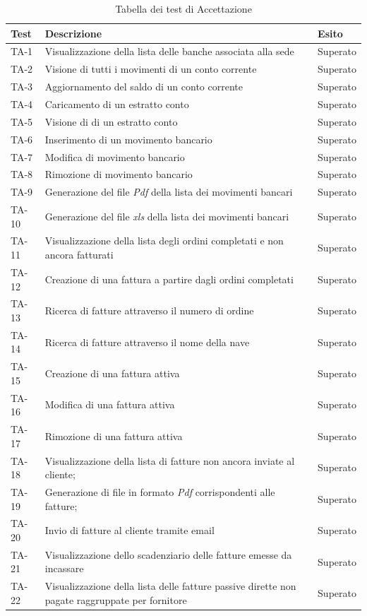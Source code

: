 \begin{table}[H]
\caption{Tabella dei test di Accettazione}
\begin{tabularx}{\textwidth}{lXl}
\hline\hline
\textbf{Test} & \textbf{Descrizione} & \textbf{Esito}\\
\hline
TA-1 & Visualizzazione della lista delle banche associata alla sede & Superato\\
TA-2 & Visione di tutti i movimenti di un conto corrente & Superato\\
TA-3 & Aggiornamento del saldo di un conto corrente & Superato\\
TA-4 & Caricamento di un estratto conto & Superato\\
TA-5 & Visione di di un estratto conto & Superato\\
TA-6 & Inserimento di un movimento bancario & Superato\\
TA-7 & Modifica di movimento bancario & Superato\\
TA-8 & Rimozione di movimento bancario & Superato\\
TA-9 & Generazione del file \emph{Pdf} della lista dei movimenti bancari & Superato\\
TA-10 & Generazione del file \emph{xls} della lista dei movimenti bancari & Superato\\
TA-11 & Visualizzazione della lista degli ordini completati e non ancora fatturati & Superato\\
TA-12 & Creazione di una fattura a partire dagli ordini completati & Superato\\
TA-13 & Ricerca di fatture attraverso il numero di ordine & Superato\\
TA-14 & Ricerca di fatture attraverso il nome della nave & Superato\\
TA-15 & Creazione di una fattura attiva & Superato\\
TA-16 & Modifica di una fattura attiva & Superato\\
TA-17 & Rimozione di una fattura attiva & Superato\\
TA-18 & Visualizzazione della lista di fatture non ancora inviate al cliente; & Superato\\
TA-19 & Generazione di file in formato \emph{Pdf} corrispondenti alle fatture; & Superato\\
TA-20 & Invio di fatture al cliente tramite email & Superato\\
TA-21 & Visualizzazione dello scadenziario delle fatture emesse da incassare & Superato\\
TA-22 & Visualizzazione della lista delle fatture passive dirette non pagate raggruppate per fornitore & Superato\\

\end{tabularx}
\end{table}

